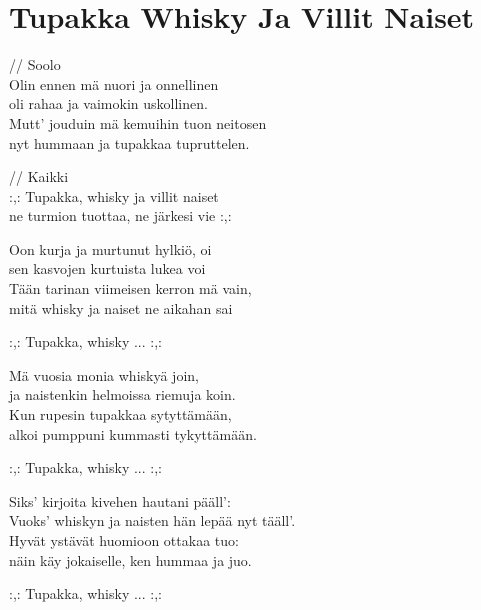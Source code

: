\section{Tupakka Whisky Ja Villit Naiset}
// Soolo\\
Olin ennen mä nuori ja onnellinen\\
oli rahaa ja vaimokin uskollinen.\\
Mutt’ jouduin mä kemuihin tuon neitosen\\
nyt hummaan ja tupakkaa tupruttelen.

// Kaikki\\
:,: Tupakka, whisky ja villit naiset\\
ne turmion tuottaa, ne järkesi vie :,:

Oon kurja ja murtunut hylkiö, oi\\
sen kasvojen kurtuista lukea voi\\
Tään tarinan viimeisen kerron mä vain,\\
mitä whisky ja naiset ne aikahan sai

:,: Tupakka, whisky ... :,:

Mä vuosia monia whiskyä join,\\
ja naistenkin helmoissa riemuja koin.\\
Kun rupesin tupakkaa sytyttämään,\\
alkoi pumppuni kummasti tykyttämään.

:,: Tupakka, whisky ... :,:

Siks’ kirjoita kivehen hautani pääll’:\\
Vuoks’ whiskyn ja naisten hän lepää nyt tääll’.\\
Hyvät ystävät huomioon ottakaa tuo:\\
näin käy jokaiselle, ken hummaa ja juo.

:,: Tupakka, whisky ... :,: